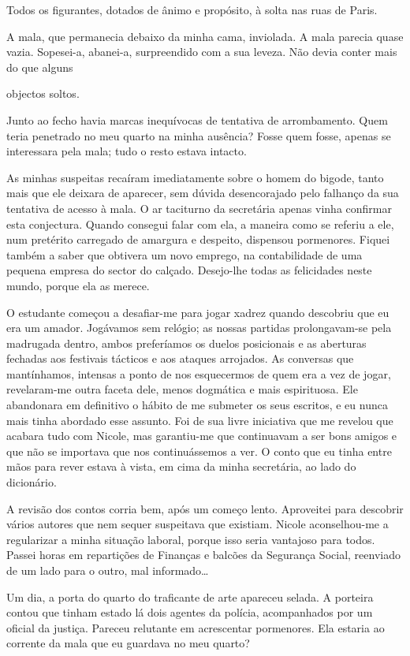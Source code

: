 Todos os figurantes, dotados de ânimo e propósito, à solta nas ruas de
Paris.

A mala, que permanecia debaixo da minha cama, inviolada. A mala parecia
quase vazia. Sopesei-a, abanei-a, surpreendido com a sua leveza. Não
devia conter mais do que alguns

objectos soltos.

Junto ao fecho havia marcas inequívocas de tentativa de arrombamento.
Quem teria penetrado no meu quarto na minha ausência? Fosse quem
fosse, apenas se interessara pela mala; tudo o resto estava intacto.

As minhas suspeitas recaíram imediatamente sobre o homem do bigode,
tanto mais que ele deixara de aparecer, sem dúvida desencorajado pelo
falhanço da sua tentativa de acesso à mala. O ar taciturno da secretária
apenas vinha confirmar esta conjectura. Quando consegui falar com ela, a
maneira como se referiu a ele, num pretérito carregado de amargura e
despeito, dispensou pormenores. Fiquei também a saber que obtivera um
novo emprego, na contabilidade de uma pequena empresa do sector do
calçado. Desejo-lhe
todas as felicidades neste mundo, porque ela as merece.

O estudante começou a desafiar-me para jogar xadrez quando descobriu que
eu era um amador. Jogávamos sem relógio; as nossas partidas
prolongavam-se pela madrugada dentro, ambos preferíamos os duelos
posicionais e as aberturas fechadas aos festivais tácticos e aos ataques
arrojados. As conversas que mantínhamos, intensas a ponto de nos
esquecermos de quem era a vez de jogar, revelaram-me outra faceta dele,
menos dogmática e mais espirituosa. Ele abandonara em definitivo o
hábito de me submeter os seus escritos, e eu nunca mais tinha abordado
esse assunto. Foi de sua livre iniciativa que me revelou que acabara
tudo com Nicole, mas garantiu-me que continuavam a ser bons amigos e que não se importava que nos
continuássemos a ver. O conto que eu tinha entre mãos para rever estava
à vista, em cima da minha secretária, ao lado do dicionário.

A revisão dos contos corria bem, após um começo lento. Aproveitei para
descobrir vários autores que nem sequer suspeitava que existiam. Nicole
aconselhou-me a regularizar a minha situação laboral, porque isso seria
vantajoso para todos. Passei horas em repartições de Finanças e balcões
da Segurança Social, reenviado de um lado para o outro, mal
informado\ldots{}

Um dia, a porta do quarto do traficante de arte apareceu selada. A
porteira contou que tinham estado lá dois agentes da polícia,
acompanhados por um oficial da justiça. Pareceu relutante em acrescentar
pormenores. Ela estaria ao corrente da mala que eu guardava no meu
quarto?

